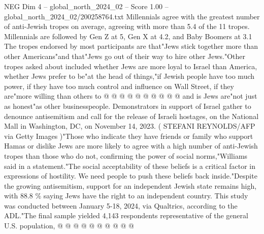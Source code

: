\begin{textsample}{NEG Dim 4 – global\_north\_2024\_02 – Score 1.00 – global\_north\_2024\_02/200258764.txt}
Millennials agree with the greatest number of anti-Jewish tropes on average, agreeing with more than 5.4 of the 11 tropes.
Millennials are followed by Gen Z at 5, Gen X at 4.2, and Baby Boomers at 3.1 The tropes endorsed by most participants are that"Jews stick together more than other Americans"and that"Jews go out of their way to hire other Jews."Other tropes asked about included whether Jews are more loyal to Israel than America, whether Jews prefer to be"at the head of things,"if Jewish people have too much power, if they have too much control and influence on Wall Street, if they are"more willing than others to @ @ @ @ @ @ @ @ @ @ and is Jews are"not just as honest"as other businesspeople.
Demonstrators in support of Israel gather to denounce antisemitism and call for the release of Israeli hostages, on the National Mall in Washington, DC, on November 14, 2023. ( STEFANI REYNOLDS/AFP via Getty Images )"Those who indicate they have friends or family who support Hamas or dislike Jews are more likely to agree with a high number of anti-Jewish tropes than those who do not, confirming the power of social norms,"Williams said in a statement."The social acceptability of these beliefs is a critical factor in expressions of hostility.
We need people to push these beliefs back inside."Despite the growing antisemitism, support for an independent Jewish state remains high, with 88.8 \% saying Jews have the right to an independent country.
This study was conducted between January 5-18, 2024, via Qualtrics, according to the ADL."The final sample yielded 4,143 respondents representative of the general U.S. population, @ @ @ @ @ @ @ @ @ @

\end{textsample}

